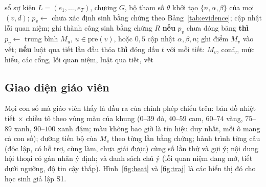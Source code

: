 \begin{algorithm}[tbp]
\caption{Phép chiếu mức hiểu từ sổ sự kiện}\label{alg:project}
\begin{algorithmic}[1]
\Require sổ sự kiện $L=(e_1,\dots,e_T)$, chương $G$, bộ tham số $\theta$
\State khởi tạo $\{n,\alpha,\beta\}$ của mọi $(v,d)$; $p_v \gets$ chưa xác định
   \State sinh bằng chứng theo Bảng~\ref{tab:evidence}; cập nhật lỗi quan niệm; ghi thành công
   \State sinh bằng chứng $R$
  \EndIf
    \State \textbf{nếu} $p_v$ chưa đóng băng \textbf{thì} $p_v \gets$ trung bình $M_u$, $u\in\mathrm{pre}(v)$, hoặc $0{,}5$
    \State cập nhật $\alpha,\beta,n$; ghi điểm $M_v$ vào vết; \textbf{nếu} luật qua tiết lần đầu thỏa \textbf{thì} đóng dấu $t$
  \EndFor
\EndFor
\State \Return với mỗi tiết: $M_v$, $\mathrm{conf}_v$, mức hiểu, các cổng, lỗi quan niệm, luật qua tiết, vết
\end{algorithmic}
\end{algorithm}

\subsection{Giao diện giáo viên}
Mọi con số mà giáo viên thấy là đầu ra của chính phép chiếu trên: bản đồ nhiệt tiết $\times$ chiều tô theo vùng màu của khung ($0$--$39$ đỏ, $40$--$59$ cam, $60$--$74$ vàng, $75$--$89$ xanh, $90$--$100$ xanh đậm; màu không bao giờ là tín hiệu duy nhất, mỗi ô mang cả con số); đường tiến bộ của $M_v$ theo từng lần bằng chứng; hành trình từng câu (độc lập, có hỗ trợ, cùng làm, chưa giải được) cùng số lần thử và gợi ý; nội dung hội thoại có gán nhãn ý định; và danh sách chú ý (lỗi quan niệm đang mở, tiết dưới ngưỡng, độ tin cậy thấp). Hình~\ref{fig:heat} và \ref{fig:traj} là các hiển thị đó cho học sinh giả lập S1.
